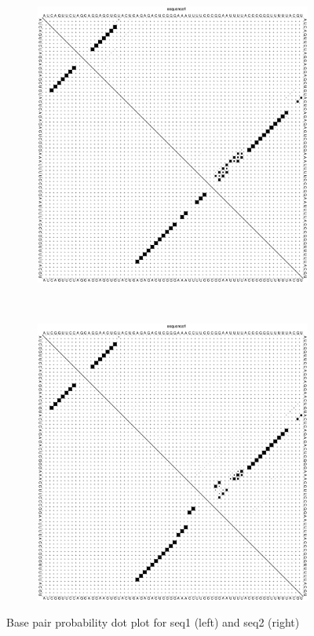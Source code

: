 \documentclass[10pt,a4paper]{article}
\begin{document}
\begin{itemize}
\begin{figure}[!h]
    \centering
    \begin{subfigure}[b]{0.25\textwidth}
\includegraphics[width = \textwidth]{figures/sequence1_dp.eps}
    \end{subfigure}
~
\begin{subfigure}[b]{0.25\textwidth}
\includegraphics[width = \textwidth]{figures/sequence2_dp.eps}
    \end{subfigure}
    \caption{Base pair probability dot plot for seq1 (left) and seq2 (right)}
\label{fig:dotplot}
\end{figure}



\end{itemize}
\end{document}
